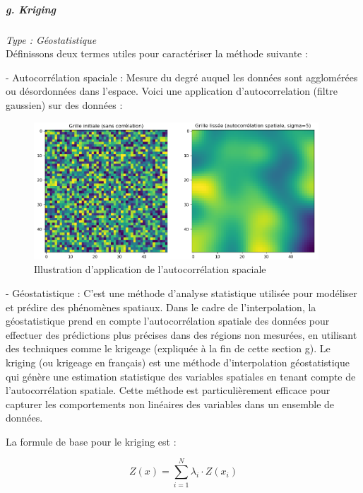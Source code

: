 


\subparagraph{g. Kriging \cite{palmer2009, kringing}}
\textit{Type : Géostatistique} \\
\phantom{----}Définissons deux termes utiles pour caractériser la méthode suivante :

- Autocorrélation spaciale : Mesure du degré auquel les données sont agglomérées ou désordonnées dans l'espace. Voici une application d'autocorrelation (filtre gaussien) sur des données :
\begin{figure}[H]
    \centering
    \includegraphics[width=0.95\textwidth]{images/autocorrelation.png}
    \caption{Illustration d'application de l'autocorrélation spaciale}
    \label{fig:autocorrelation}
\end{figure}
- Géostatistique : C'est une méthode d'analyse statistique utilisée pour modéliser et prédire des phénomènes spatiaux. Dans le cadre de l'interpolation, la géostatistique prend en compte l'autocorrélation spatiale des données pour effectuer des prédictions plus précises dans des régions non mesurées, en utilisant des techniques comme le krigeage (expliquée à la fin de cette section g).
Le kriging (ou krigeage en français) est une méthode d'interpolation géostatistique qui génère une estimation statistique des variables spatiales en tenant compte de l'autocorrélation spatiale. Cette méthode est particulièrement efficace pour capturer les comportements non linéaires des variables dans un ensemble de données.

La formule de base pour le kriging est :

\begin{equation}
    Z(x) = \sum_{i=1}^{N} \lambda_i \cdot Z(x_i)
\end{equation}

